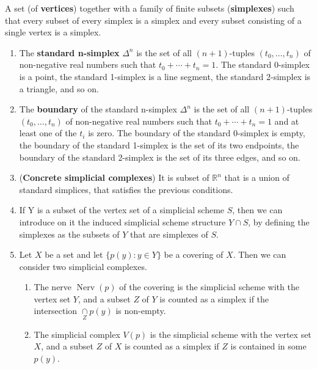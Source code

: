 A set (of \textbf{vertices}) together with a  family of finite subsets (\textbf{simplexes}) such that every subset of every simplex is a simplex and every subset consisting of a single vertex is a simplex.  

\begin{example}
    \begin{enumerate}
        \item The \textbf{standard n-simplex} $\Delta^n$ is the set of all $(n+1)$-tuples $(t_0, \ldots, t_n)$ of non-negative real numbers such that $t_0 + \cdots + t_n = 1$. The standard 0-simplex is a point, the standard 1-simplex is a line segment, the standard 2-simplex is a triangle, and so on.

        \item The \textbf{boundary} of the standard n-simplex $\Delta^n$ is the set of all $(n+1)$-tuples $(t_0, \ldots, t_n)$ of non-negative real numbers such that $t_0 + \cdots + t_n = 1$ and at least one of the $t_i$ is zero. The boundary of the standard 0-simplex is empty, the boundary of the standard 1-simplex is the set of its two endpoints, the boundary of the standard 2-simplex is the set of its three edges, and so on.

        \item (\textbf{Concrete simplicial complexes}) It is subset of $\mathbb{R}^n$ that is a union of standard simplices, that satisfies the previous conditions.

        \item If Y is a subset of the vertex set of a simplicial scheme $S$, then we can introduce on it the induced simplicial scheme structure $ Y \cap S$, by defining the simplexes as the subsets of $ Y $ that are simplexes of $S$.  

        \item Let $X$ be a set and let $\{p(y): y \in Y\}$ be a covering of $X$. Then we can consider two simplicial complexes. 
        \begin{enumerate}
            \item The nerve $\operatorname{Nerv}(p)$ of the covering is the simplicial scheme with the vertex set $Y$, and a subset $Z$ of $Y$ is counted as a simplex if the intersection $\underset{Z}{\cap} p(y)$ is non-empty. 
            \item The simplicial complex $V(p)$ is the simplicial scheme with the vertex set $X$, and a subset $Z$ of $X$ is counted as a simplex if $Z$ is contained in some $p(y)$.
        \end{enumerate}
    \end{enumerate}
\end{example}

